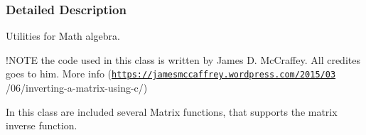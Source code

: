 \subsubsection{Detailed Description}
Utilities for Math algebra. 

!\+N\+O\+TE the code used in this class is written by James D. Mc\+Craffey. All credites goes to him. More info (\href{https://jamesmccaffrey.wordpress.com/2015/03}{\tt https\+://jamesmccaffrey.\+wordpress.\+com/2015/03} /06/inverting-\/a-\/matrix-\/using-\/c/)

In this class are included several Matrix functions, that supports the matrix inverse function. 